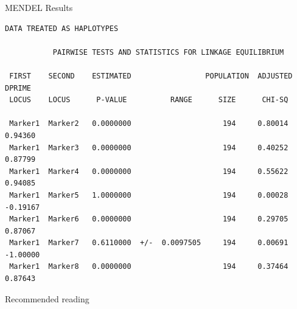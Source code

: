 \documentclass[serif,mathserif,professionalfonts,svgnames]{beamer}
\begin{document}
\begin{frame}[containsverbatim]{MENDEL Results}
\begin{Verbatim}[fontsize=\relsize{-2}]
                     DATA TREATED AS HAPLOTYPES

           PAIRWISE TESTS AND STATISTICS FOR LINKAGE EQUILIBRIUM

 FIRST    SECOND    ESTIMATED                 POPULATION  ADJUSTED    DPRIME
 LOCUS    LOCUS      P-VALUE          RANGE      SIZE      CHI-SQ

 Marker1  Marker2   0.0000000                     194     0.80014    0.94360
 Marker1  Marker3   0.0000000                     194     0.40252    0.87799
 Marker1  Marker4   0.0000000                     194     0.55622    0.94085
 Marker1  Marker5   1.0000000                     194     0.00028   -0.19167
 Marker1  Marker6   0.0000000                     194     0.29705    0.87067
 Marker1  Marker7   0.6110000  +/-  0.0097505     194     0.00691   -1.00000
 Marker1  Marker8   0.0000000                     194     0.37464    0.87643
\end{Verbatim}
\end{frame}


\begin{frame}{Recommended reading}
  \nocite{*}
  {}
  
\end{frame}
\end{document}
